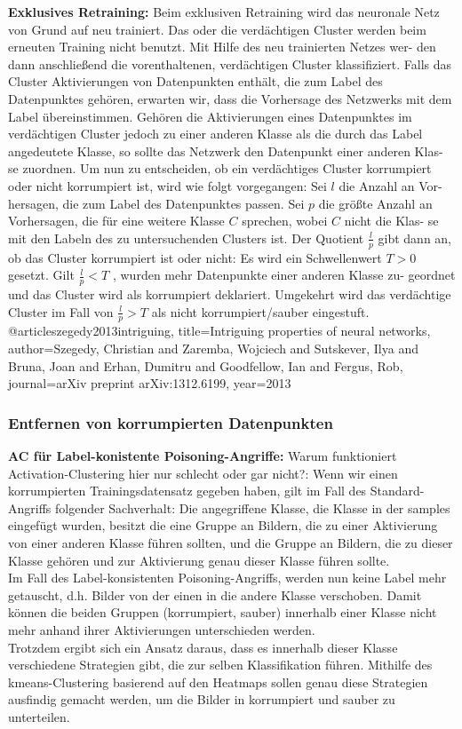 \documentclass[11pt,a4paper]{article}
\numberwithin{equation}{section}
\begin{document}
		\noindent \textbf{Exklusives Retraining:} Beim exklusiven Retraining wird das neuronale Netz
		von Grund auf neu trainiert. Das oder die verdächtigen Cluster werden beim
		erneuten Training nicht benutzt. Mit Hilfe des neu trainierten Netzes wer-
		den dann anschließend die vorenthaltenen, verdächtigen Cluster klassifiziert.
		Falls das Cluster Aktivierungen von Datenpunkten enthält, die zum Label des
		Datenpunktes gehören, erwarten wir, dass die Vorhersage des Netzwerks mit
		dem Label übereinstimmen. Gehören die Aktivierungen eines Datenpunktes im
		verdächtigen Cluster jedoch zu einer anderen Klasse als die durch das Label
		angedeutete Klasse, so sollte das Netzwerk den Datenpunkt einer anderen Klas-
		se zuordnen. Um nun zu entscheiden, ob ein verdächtiges Cluster korrumpiert
		oder nicht korrumpiert ist, wird wie folgt vorgegangen: Sei $l$ die Anzahl an Vor-
		hersagen, die zum Label des Datenpunktes passen. Sei $p$ die größte Anzahl an
		Vorhersagen, die für eine weitere Klasse $C$ sprechen, wobei $C$ nicht die Klas-
		se mit den Labeln des zu untersuchenden Clusters ist. Der Quotient $\frac{l}{p}$ gibt
		dann an, ob das Cluster korrumpiert ist oder nicht: Es wird ein Schwellenwert
		$T > 0$ gesetzt. Gilt $\frac{l}{p} < T$ , wurden mehr Datenpunkte einer anderen Klasse zu-
		geordnet und das Cluster wird als korrumpiert deklariert. Umgekehrt wird das
		verdächtige Cluster im Fall von $\frac{l}{p} > T$ als nicht korrumpiert/sauber eingestuft.
		@article{szegedy2013intriguing,
			title={Intriguing properties of neural networks},
			author={Szegedy, Christian and Zaremba, Wojciech and Sutskever, Ilya and Bruna, Joan and Erhan, Dumitru and Goodfellow, Ian and Fergus, Rob},
			journal={arXiv preprint arXiv:1312.6199},
			year={2013}
		}
		
		\subsubsection{Entfernen von korrumpierten Datenpunkten}
	
	\noindent \textbf{AC für Label-konistente Poisoning-Angriffe:} Warum funktioniert Activation-Clustering hier nur schlecht oder gar nicht?: Wenn wir einen korrumpierten Trainingsdatensatz gegeben haben, gilt im Fall des Standard-Angriffs folgender Sachverhalt: Die angegriffene Klasse, die Klasse in der samples eingefügt wurden, besitzt die eine Gruppe an Bildern, die zu einer Aktivierung von einer anderen Klasse führen sollten, und die Gruppe an Bildern, die zu dieser Klasse gehören und zur Aktivierung genau dieser Klasse führen sollte.\\
	Im Fall des Label-konsistenten Poisoning-Angriffs, werden nun keine Label mehr getauscht, d.h. Bilder von der einen in die andere Klasse verschoben. Damit können die beiden Gruppen (korrumpiert, sauber) innerhalb einer Klasse nicht mehr anhand ihrer Aktivierungen unterschieden werden.\\
	Trotzdem ergibt sich ein Ansatz daraus, dass es innerhalb dieser Klasse verschiedene \glqq Strategien\grqq{}  gibt, die zur selben Klassifikation führen. Mithilfe des kmeans-Clustering basierend auf den Heatmaps sollen genau diese Strategien ausfindig gemacht werden, um die Bilder in korrumpiert und sauber zu unterteilen.
	
\end{document}
